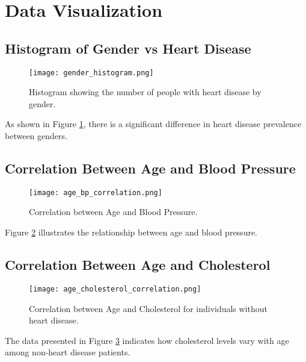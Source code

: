 \documentclass{article}
\begin{document}
\section{Data Visualization}

\subsection{Histogram of Gender vs Heart Disease}
\begin{figure}[h]
    \centering
    \texttt{[image: gender\_histogram.png]}
    \caption{Histogram showing the number of people with heart disease by gender.}
    \label{fig:gender_histogram}
\end{figure}

As shown in Figure \ref{fig:gender_histogram}, there is a significant difference in heart disease prevalence between genders.

\subsection{Correlation Between Age and Blood Pressure}
\begin{figure}[h]
    \centering
    \texttt{[image: age\_bp\_correlation.png]}
    \caption{Correlation between Age and Blood Pressure.}
    \label{fig:age_bp}
\end{figure}

Figure \ref{fig:age_bp} illustrates the relationship between age and blood pressure.

\subsection{Correlation Between Age and Cholesterol}
\begin{figure}[h]
    \centering
    \texttt{[image: age\_cholesterol\_correlation.png]}
    \caption{Correlation between Age and Cholesterol for individuals without heart disease.}
    \label{fig:age_cholesterol}
\end{figure}

The data presented in Figure \ref{fig:age_cholesterol} indicates how cholesterol levels vary with age among non-heart disease patients.
\end{document}
